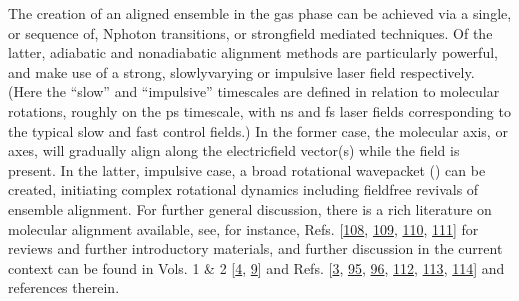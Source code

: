 \documentclass[letterpaper,table,10pt,english]{jupyterBook}
\begin{document}
\sphinxAtStartPar
The creation of an aligned ensemble in the gas phase can be achieved via a single, or sequence of, N\sphinxhyphen{}photon transitions, or strong\sphinxhyphen{}field mediated techniques. Of the latter, adiabatic and non\sphinxhyphen{}adiabatic alignment methods are particularly powerful, and make use of a strong, slowly\sphinxhyphen{}varying or impulsive laser field respectively. (Here the “slow” and “impulsive” time\sphinxhyphen{}scales are defined in relation to molecular rotations, roughly on the ps time\sphinxhyphen{}scale, with ns and fs laser fields corresponding to the typical slow and fast control fields.) In the former case, the molecular axis, or axes, will gradually align along the electric\sphinxhyphen{}field vector(s) while the field is present. In the latter, impulsive case, a broad rotational wavepacket ({\hyperref[\detokenize{backmatter/glossary:term-RWP}]{}}) can be created, initiating complex rotational dynamics including field\sphinxhyphen{}free revivals of ensemble alignment. For further general discussion, there is a rich literature on molecular alignment available, see, for instance, Refs. {[}\hyperlink{cite.backmatter/bibliography:id901}{108}, \hyperlink{cite.backmatter/bibliography:id644}{109}, \hyperlink{cite.backmatter/bibliography:id727}{110}, \hyperlink{cite.backmatter/bibliography:id1000}{111}{]} for reviews and further introductory materials, and further discussion in the current context can be found in  Vols. 1 \& 2 {[}\hyperlink{cite.backmatter/bibliography:id676}{4}, \hyperlink{cite.backmatter/bibliography:id677}{9}{]} and Refs. {[}\hyperlink{cite.backmatter/bibliography:id685}{3}, \hyperlink{cite.backmatter/bibliography:id839}{95}, \hyperlink{cite.backmatter/bibliography:id935}{96}, \hyperlink{cite.backmatter/bibliography:id833}{112}, \hyperlink{cite.backmatter/bibliography:id834}{113}, \hyperlink{cite.backmatter/bibliography:id663}{114}{]} and references therein.
\end{document}
